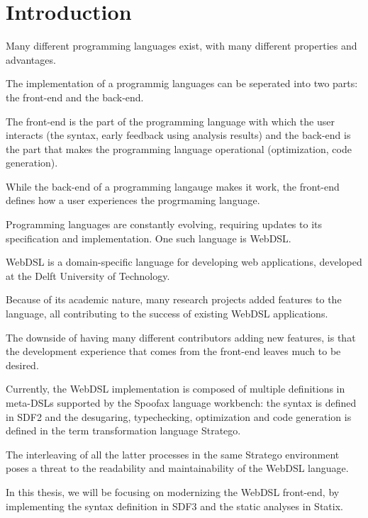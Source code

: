 
\chapter{\label{chap:introduction}Introduction}

  Many different programming languages exist, with many different properties and advantages.

  The implementation of a programmig languages can be seperated into two parts: the front-end and the back-end. 

  The front-end is the part of the programming language with which the user interacts (the syntax, early feedback using analysis results) and the back-end is the part that makes the programming language operational (optimization, code generation).

  While the back-end of a programming langauge makes it work, the front-end defines how a user experiences the progrmaming language. %

  Programming languages are constantly evolving, requiring updates to its specification and implementation. One such language is WebDSL.

  WebDSL is a domain-specific language for developing web applications, developed at the Delft University of Technology.

  Because of its academic nature, many research projects added features to the language, all contributing to the success of existing WebDSL applications.

  The downside of having many different contributors adding new features, is that the development experience that comes from the front-end leaves much to be desired. %

  Currently, the WebDSL implementation is composed of multiple definitions in meta-DSLs supported by the Spoofax language workbench: the syntax is defined in SDF2 and the desugaring, typechecking, optimization and code generation is defined in the term transformation language Stratego.

  The interleaving of all the latter processes in the same Stratego environment poses a threat to the readability and maintainability of the WebDSL language.

  In this thesis, we will be focusing on modernizing the WebDSL front-end, by implementing the syntax definition in SDF3 and the static analyses in Statix.

